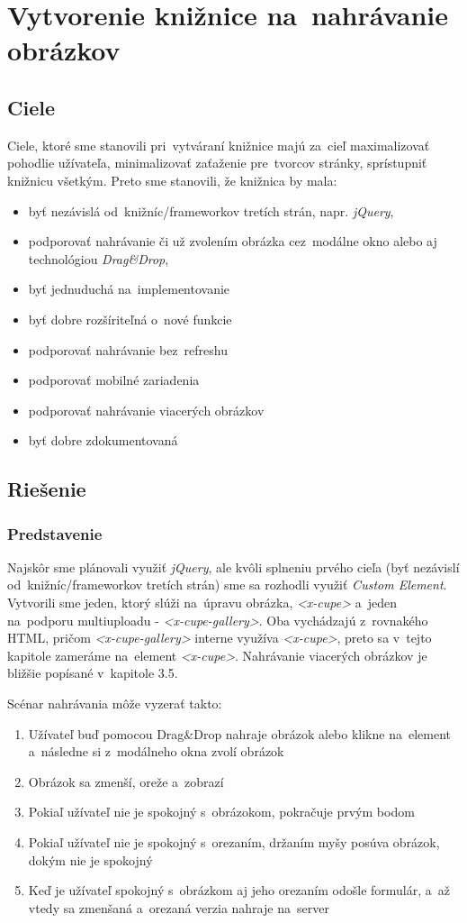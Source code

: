 \chapter{Vytvorenie knižnice na~nahrávanie obrázkov}
\section{Ciele}

Ciele, ktoré sme stanovili pri~vytváraní knižnice majú za~cieľ maximalizovať pohodlie užívateľa, minimalizovať zaťaženie pre~tvorcov stránky, sprístupniť knižnicu všetkým. Preto sme stanovili, že knižnica by mala:

\begin{itemize}
	\item byť nezávislá od~knižníc/frameworkov tretích strán, napr. \emph{jQuery},
	\item podporovať nahrávanie či už zvolením obrázka cez~modálne okno alebo aj technológiou \emph{Drag&Drop}, 
	\item byť jednuduchá na~implementovanie
	\item byť dobre rozšíriteľná o~nové funkcie
	\item podporovať nahrávanie bez~refreshu
	\item podporovať mobilné zariadenia
	\item podporovať nahrávanie viacerých obrázkov
	\item byť dobre zdokumentovaná
\end{itemize}


\section{Riešenie}
\subsection{Predstavenie}
Najskôr sme plánovali využiť \emph{jQuery}, ale kvôli splneniu prvého cieľa (byť nezávislí od~knižníc/frameworkov tretích strán) sme sa rozhodli využiť \emph{Custom Element}. Vytvorili sme jeden, ktorý slúži na~úpravu obrázka, \emph{<x-cupe>} a~jeden na~podporu multiuploadu - \emph{<x-cupe-gallery>}. Oba vychádzajú z~rovnakého HTML, pričom \emph{<x-cupe-gallery>} interne využíva \emph{<x-cupe>}, preto sa v~tejto kapitole zameráme na~element \emph{<x-cupe>}. Nahrávanie viacerých obrázkov je bližšie popísané v~kapitole 3.5.

Scénar nahrávania môže vyzerať takto:
\begin{enumerate}
	\item Užívateľ buď pomocou Drag&Drop nahraje obrázok alebo klikne na~element a~následne si z~modálneho okna zvolí obrázok
	\item Obrázok sa zmenší, oreže a~zobrazí
	\item Pokiaľ užívateľ nie je spokojný s~obrázokom, pokračuje prvým bodom
	\item Pokiaľ užívateľ nie je spokojný s~orezaním, držaním myšy posúva obrázok, dokým nie je spokojný
	\item Keď je užívateľ spokojný s~obrázkom aj jeho orezaním odošle formulár, a~až vtedy sa zmenšaná a~orezaná verzia nahraje na~server
\end{enumerate}


